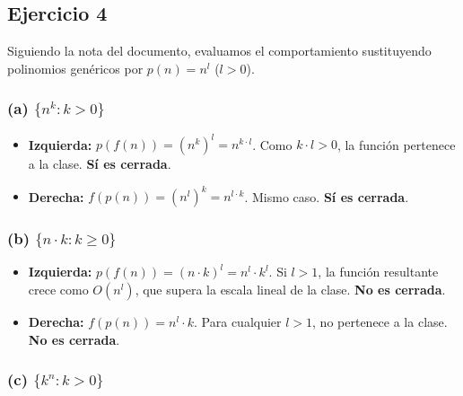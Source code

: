\documentclass[12pt]{book} %
\providecommand{\tightlist}{%
  \setlength{\itemsep}{0pt}\setlength{\parskip}{0pt}}
\begin{document}
\hypertarget{ejercicio-4}{%
\subsection{Ejercicio 4}\label{ejercicio-4}}

Siguiendo la nota del documento, evaluamos el comportamiento
sustituyendo polinomios genéricos por \(p(n) = n^l\) (\(l > 0\)).

\hypertarget{a-nk-k-0}{%
\subsubsection{\texorpdfstring{(a)
\(\{n^k : k > 0\}\)}{(a) \textbackslash\{n\^{}k : k \textgreater{} 0\textbackslash\}}}\label{a-nk-k-0}}

\begin{itemize}
\tightlist
\item
  \textbf{Izquierda:} \(p(f(n)) = (n^k)^l = n^{k \cdot l}\). Como
  \(k \cdot l > 0\), la función pertenece a la clase. \textbf{Sí es
  cerrada}.
\item
  \textbf{Derecha:} \(f(p(n)) = (n^l)^k = n^{l \cdot k}\). Mismo caso.
  \textbf{Sí es cerrada}.
\end{itemize}

\hypertarget{b-n-cdot-k-k-ge-0}{%
\subsubsection{\texorpdfstring{(b)
\(\{n \cdot k : k \ge 0\}\)}{(b) \textbackslash\{n \textbackslash cdot k : k \textbackslash ge 0\textbackslash\}}}\label{b-n-cdot-k-k-ge-0}}

\begin{itemize}
\tightlist
\item
  \textbf{Izquierda:} \(p(f(n)) = (n \cdot k)^l = n^l \cdot k^l\). Si
  \(l > 1\), la función resultante crece como \(O(n^l)\), que supera la
  escala lineal de la clase. \textbf{No es cerrada}.
\item
  \textbf{Derecha:} \(f(p(n)) = n^l \cdot k\). Para cualquier \(l > 1\),
  no pertenece a la clase. \textbf{No es cerrada}.
\end{itemize}

\hypertarget{c-kn-k-0}{%
\subsubsection{\texorpdfstring{(c)
\(\{k^n : k > 0\}\)}{(c) \textbackslash\{k\^{}n : k \textgreater{} 0\textbackslash\}}}\label{c-kn-k-0}}
\end{document}
